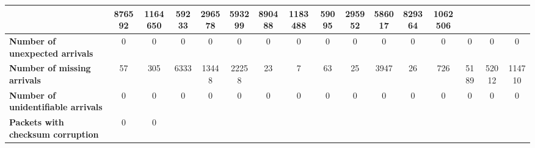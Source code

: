 \begin{table}[!h]
{\begin{tabular}{|l|ccccc|ccccc|ccccc|}
            & \multicolumn{1}{c|}{876592}
            & \multicolumn{1}{c|}{1164650}
            & \multicolumn{1}{c|}{59233}
            & \multicolumn{1}{c|}{296578}
            & \multicolumn{1}{c|}{593299}
            & \multicolumn{1}{c|}{890488}
            & \multicolumn{1}{c|}{1183488}
            & \multicolumn{1}{c|}{59095}
            & \multicolumn{1}{c|}{295952}
            & \multicolumn{1}{c|}{586017}
            & \multicolumn{1}{c|}{829364}
            & \multicolumn{1}{c|}{1062506}
            \\ \hline
            \textbf{Number of unexpected arrivals} & \multicolumn{1}{c|}{0} & \multicolumn{1}{c|}{0}
            & \multicolumn{1}{c|}{0}
            & \multicolumn{1}{c|}{0}
            & \multicolumn{1}{c|}{0}
            & \multicolumn{1}{c|}{0}
            & \multicolumn{1}{c|}{0}
            & \multicolumn{1}{c|}{0}
            & \multicolumn{1}{c|}{0}
            & \multicolumn{1}{c|}{0}
            & \multicolumn{1}{c|}{0}
            & \multicolumn{1}{c|}{0}
            & \multicolumn{1}{c|}{0}
            & \multicolumn{1}{c|}{0}
            & \multicolumn{1}{c|}{0}
            \\ \hline
            \textbf{Number of missing arrivals} & \multicolumn{1}{c|}{57} & \multicolumn{1}{c|}{305}
            & \multicolumn{1}{c|}{6333}
            & \multicolumn{1}{c|}{13448}
            & \multicolumn{1}{c|}{22258}
            & \multicolumn{1}{c|}{23}
            & \multicolumn{1}{c|}{7}
            & \multicolumn{1}{c|}{63}
            & \multicolumn{1}{c|}{25}
            & \multicolumn{1}{c|}{3947}
            & \multicolumn{1}{c|}{26}
            & \multicolumn{1}{c|}{726}
            & \multicolumn{1}{c|}{5189}
            & \multicolumn{1}{c|}{52012}
            & \multicolumn{1}{c|}{114710}
            \\ \hline
            \textbf{Number of unidentifiable arrivals} & \multicolumn{1}{c|}{0} & \multicolumn{1}{c|}{0}
            & \multicolumn{1}{c|}{0}
            & \multicolumn{1}{c|}{0}
            & \multicolumn{1}{c|}{0}
            & \multicolumn{1}{c|}{0}
            & \multicolumn{1}{c|}{0}
            & \multicolumn{1}{c|}{0}
            & \multicolumn{1}{c|}{0}
            & \multicolumn{1}{c|}{0}
            & \multicolumn{1}{c|}{0}
            & \multicolumn{1}{c|}{0}
            & \multicolumn{1}{c|}{0}
            & \multicolumn{1}{c|}{0}
            & \multicolumn{1}{c|}{0}
            \\ \hline
            \textbf{Packets with checksum corruption} & \multicolumn{1}{c|}{0} & \multicolumn{1}{c|}{0}

\end{tabular}}
\end{table}
